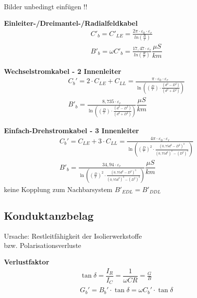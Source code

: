 Bilder unbedingt einfügen !!

\textbf{Einleiter-/Dreimantel-/Radialfeldkabel}
\begin{gather*}
        C'_b = C'_{LE} = \frac{2\pi \cdot \varepsilon_0 \cdot \varepsilon_r}{ln \left( \frac{R}{r} \right)}\\
        B'_b= \omega C'_b  = \frac{17,47 \cdot \varepsilon_r}{ln \left(\frac{R}{r} \right)} \dfrac{\mu S}{km}
    \end{gather*}

\textbf{Wechselstromkabel - 2 Innenleiter}
\begin{gather*}
    C_{b}' = 2 \cdot C_{LE} + C_{LL} = \frac{\pi \cdot \varepsilon_{0} \cdot \varepsilon_{r}}{\ln \left( \left(\frac{D}{r}\right) \cdot \frac{(d^2 - D^2)}{(d^2 + D^2)} \right)}\\
   B'_b  = \frac{8,735 \cdot \varepsilon_{r}}{\ln \left( \left(\frac{D}{r}\right) \cdot \frac{(d^2 - D^2)}{(d^2 + D^2)} \right)} \dfrac{\mu S}{km}
\end{gather*}

\textbf{Einfach-Drehstromkabel - 3 Innenleiter}
\begin{gather*}
    C_{b}' = C_{LE} + 3 \cdot C_{LL} = \frac{4 \pi \cdot \varepsilon_{0} \cdot \varepsilon_{r}}{\ln \left( \left(\frac{D}{r}\right)^2 \cdot \frac{(0,75d^2 - D^2)^3}{(0,75d^2)^3 - (D^2)^3} \right)}\\
    B'_b = \frac{34,94 \cdot \varepsilon_{r}}{\ln \left( \left(\frac{D}{r}\right)^2 \cdot \frac{(0,75d^2 - D^2)^3}{(0,75d^2)^3 - (D^2)^3} \right)}
     \dfrac{\mu S}{km}
\end{gather*}
\indent keine Kopplung zum Nachbarsystem $B'_{\mathit{EDL}} = B'_{\mathit{DDL}}$

\subsection{Konduktanzbelag}
Ursache: Restleitfähigkeit der Isolierwerkstoffe\\ \indent bzw. Polarisationsverluste

\textbf{Verlustfaktor}
\begin{gather*}
    \tan \delta = \dfrac{I_{R}}{I_{C}} = \dfrac{1}{\omega C R} = \frac{G}{B}\\
    G_{b}' = B_{b}' \cdot \tan \delta = \omega C_{b}' \cdot \tan \delta
\end{gather*}
\begin{center}

\end{center}

